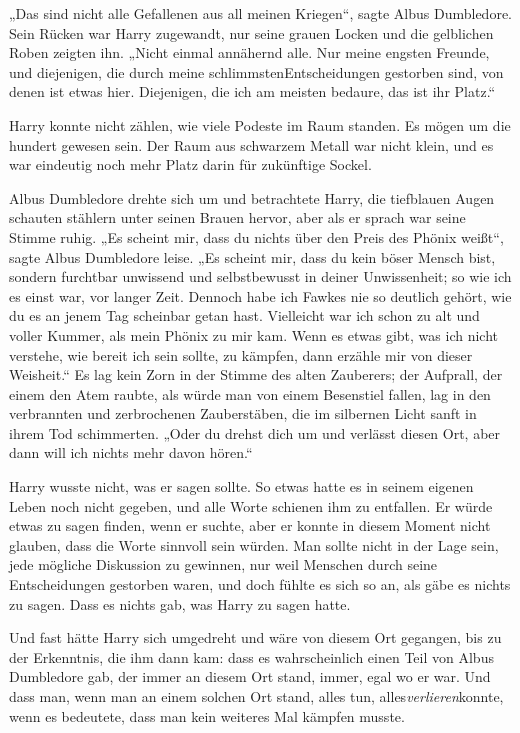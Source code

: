 {„Das sind nicht alle Gefallenen aus all meinen Kriegen“, sagte Albus Dumbledore. Sein Rücken war Harry zugewandt, nur seine grauen Locken und die gelblichen Roben zeigten ihn. „Nicht einmal annähernd alle. Nur meine engsten Freunde, und diejenigen, die durch meine schlimmstenEntscheidungen gestorben sind, von denen ist etwas hier. Diejenigen, die ich am meisten bedaure, das ist ihr Platz.“

Harry konnte nicht zählen, wie viele Podeste im Raum standen. Es mögen um die hundert gewesen sein. Der Raum aus schwarzem Metall war nicht klein, und es war eindeutig noch mehr Platz darin für zukünftige Sockel.

Albus Dumbledore drehte sich um und betrachtete Harry, die tiefblauen Augen schauten stählern unter seinen Brauen hervor, aber als er sprach war seine Stimme ruhig. „Es scheint mir, dass du nichts über den Preis des Phönix weißt“, sagte Albus Dumbledore leise. „Es scheint mir, dass du kein böser Mensch bist, sondern furchtbar unwissend und selbstbewusst in deiner Unwissenheit; so wie ich es einst war, vor langer Zeit. Dennoch habe ich Fawkes nie so deutlich gehört, wie du es an jenem Tag scheinbar getan hast. Vielleicht war ich schon zu alt und voller Kummer, als mein Phönix zu mir kam. Wenn es etwas gibt, was ich nicht verstehe, wie bereit ich sein sollte, zu kämpfen, dann erzähle mir von dieser Weisheit.“ Es lag kein Zorn in der Stimme des alten Zauberers; der Aufprall, der einem den Atem raubte, als würde man von einem Besenstiel fallen, lag in den verbrannten und zerbrochenen Zauberstäben, die im silbernen Licht sanft in ihrem Tod schimmerten. „Oder du drehst dich um und verlässt diesen Ort, aber dann will ich nichts mehr davon hören.“

Harry wusste nicht, was er sagen sollte. So etwas hatte es in seinem eigenen Leben noch nicht gegeben, und alle Worte schienen ihm zu entfallen. Er würde etwas zu sagen finden, wenn er suchte, aber er konnte in diesem Moment nicht glauben, dass die Worte sinnvoll sein würden. Man sollte nicht in der Lage sein, jede mögliche Diskussion zu gewinnen, nur weil Menschen durch seine Entscheidungen gestorben waren, und doch fühlte es sich so an, als gäbe es nichts zu sagen. Dass es nichts gab, was Harry zu sagen hatte.

Und fast hätte Harry sich umgedreht und wäre von diesem Ort gegangen, bis zu der Erkenntnis, die ihm dann kam: dass es wahrscheinlich einen Teil von Albus Dumbledore gab, der immer an diesem Ort stand, immer, egal wo er war. Und dass man, wenn man an einem solchen Ort stand, alles tun, alles\emph{verlieren}konnte, wenn es bedeutete, dass man kein weiteres Mal kämpfen musste.

}
